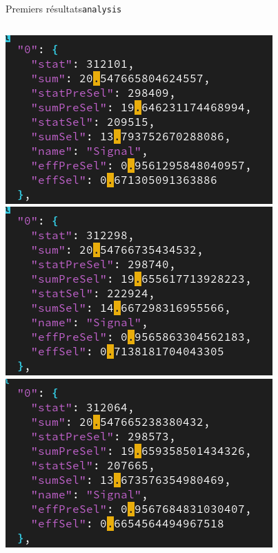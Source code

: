 \documentclass[9pt]{beamer}
\begin{document}
\begin{frame}{Premiers résultats}{\texttt{analysis}}

	\begin{columns}
    
        \begin{column}{0.3\textwidth}
				\includegraphics[height=0.25\textheight]{../img/bb_original_run_1.png}\\
				\includegraphics[height=0.25\textheight]{../img/bb_original_run_2.png}\\
				\includegraphics[height=0.25\textheight]{../img/bb_original_run_3.png}
        \end{column}
        

\end{columns}
\end{frame}
\end{document}
